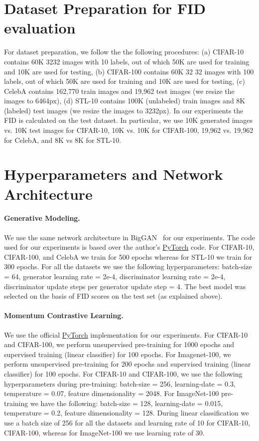 \documentclass{article} \usepackage{iclr2021_conference,times}
\begin{document}
\section{Dataset Preparation for FID evaluation}
For dataset preparation, we follow the the following procedures: (a) CIFAR-10 contains 60K 3232
images with 10 labels, out of which 50K are used for training
and 10K are used for testing, (b) CIFAR-100 contains 60K 32  32 images with 100 labels, out of which 50K are used for training and 10K are used for testing, (c)
CelebA contains 162,770 train images and 19,962 test images (we resize the images to 6464px), (d) STL-10 contains 100K (unlabeled) train images and 8K (labeled) test images (we resize the images to 3232px). In our experiments the FID is calculated on the test dataset. In particular, we use 10K generated images vs. 10K test images for CIFAR-10, 10K vs. 10K for CIFAR-100, 19,962 vs. 19,962 for CelebA, and 8K vs 8K for STL-10.


\section{Hyperparameters and Network Architecture}
\label{app:archit}
\paragraph{Generative Modeling.} We use the same network architecture in BigGAN~\cite{brock2018large} for our experiments. The code used for our experiments is based over the author's  \href{https://github.com/ajbrock/BigGAN-PyTorch}{PyTorch} code. For CIFAR-10, CIFAR-100, and CelebA we train for 500 epochs whereas for STL-10 we train for 300 epochs. For all the datasets we use the following hyperparameters: batch-size = 64, generator learning rate = 2e-4, discriminator learning rate = 2e-4, discriminator update steps per generator update step = 4. The best model was selected on the basis of FID scores on the test set (as explained above).


\paragraph{Momentum Contrastive Learning.}  We use the official \href{https://github.com/facebookresearch/moco}{PyTorch} implementation for our experiments. For CIFAR-10 and CIFAR-100, we perform unsupervised pre-training for 1000 epochs and supervised training (linear classifier) for 100 epochs. For Imagenet-100, we perform unsupervised pre-training for 200 epochs and supervised training (linear classifier) for 100 epochs. For CIFAR-10 and CIFAR-100, we use the following hyperparameters during pre-training: batch-size = 256, learning-date = 0.3, temperature = 0.07, feature dimensionality = 2048. For ImageNet-100 pre-training we have the following: batch-size = 128, learning-date = 0.015, temperature = 0.2, feature dimensionality = 128. During linear classification we use a batch size of 256 for all the datasets and learning rate of 10 for CIFAR-10, CIFAR-100, whereas for ImageNet-100 we use learning rate of 30.
\end{document}
